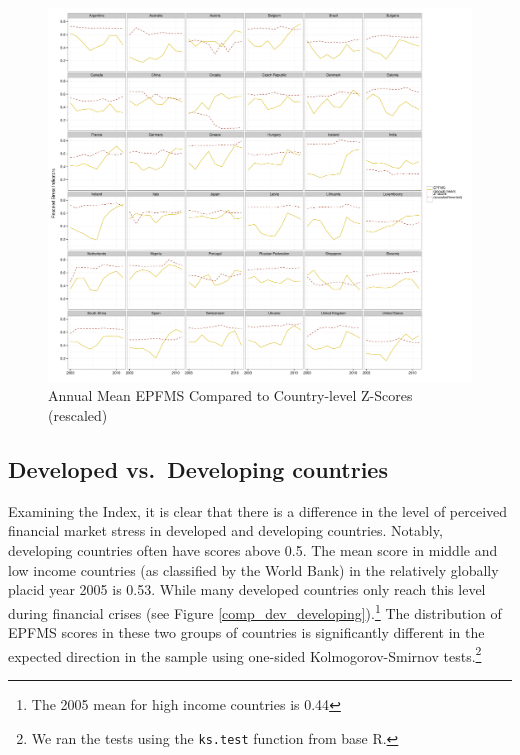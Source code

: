 \documentclass[]{article}
\begin{document}
\clearpage

\begin{landscape}
\begin{figure}

    \caption{Annual Mean EPFMS Compared to Country-level Z-Scores (rescaled)}
    \label{z_score}

    \begin{center}
        \includegraphics[scale=0.4]{analysis/figures/compare_to_z-score.pdf}
    \end{center}

\end{figure}
\end{landscape}

\subsection{Developed vs.~Developing
countries}\label{developed-vs.developing-countries}

Examining the Index, it is clear that there is a
difference in the level of perceived financial market stress in
developed and developing countries. Notably, developing countries often have scores above 0.5. The mean score in middle and low income countries (as classified by the World Bank) in the relatively globally placid year 2005 is 0.53. While many developed countries only reach this level during financial crises (see Figure \ref{comp_dev_developing}).\footnote{The 2005 mean for high income countries is 0.44} The distribution of EPFMS scores in these two groups of countries is significantly different in the expected direction in the sample using one-sided Kolmogorov-Smirnov tests.\footnote{We ran the tests using the \texttt{ks.test} function from base R.}
\end{document}

